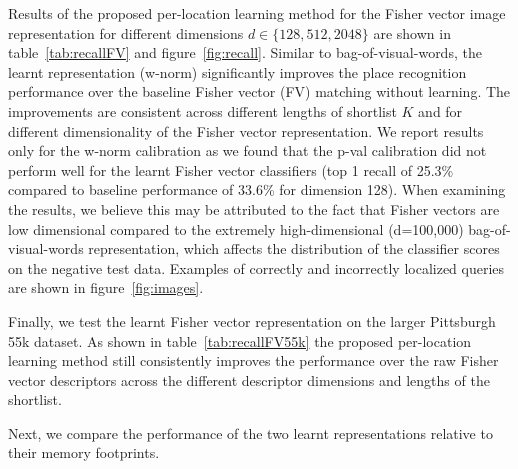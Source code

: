     Results of the proposed per-location learning method for the Fisher vector image representation for different dimensions $d\in\{128, 512, 2048\}$ 
    are shown in table~\ref{tab:recallFV} and figure~\ref{fig:recall}.
    Similar to bag-of-visual-words, the learnt representation (w-norm) significantly improves the place recognition performance over the baseline Fisher vector (FV) matching without learning. The improvements are consistent across different lengths of shortlist $K$ and for different dimensionality of the Fisher vector representation. 
    We report results only for the w-norm calibration as we found that the p-val calibration did not perform well for the learnt Fisher vector classifiers (top 1 recall of 25.3\% compared to baseline performance of 33.6\% for dimension 128). When examining the results, we believe this may be attributed to the fact that Fisher vectors are low dimensional compared to the extremely high-dimensional (d=100,000) bag-of-visual-words representation, which affects the distribution of the classifier scores on the negative test data. 
    Examples of correctly and incorrectly localized queries are shown in figure~\ref{fig:images}. 
    
        Finally, we test the learnt Fisher vector representation on the larger Pittsburgh 55k dataset. As shown in table~\ref{tab:recallFV55k} the proposed per-location learning method still consistently improves the performance over the raw Fisher vector descriptors across the different descriptor dimensions and lengths of the shortlist. 

\noindent
        Next, we compare the performance of the two learnt representations relative to their memory footprints.  


